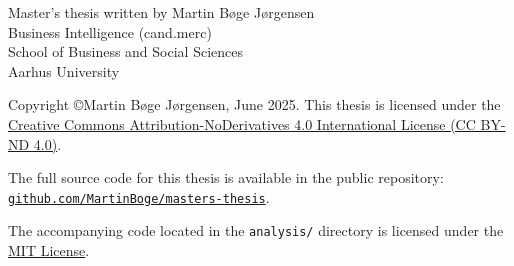 \thispagestyle{plain}

Master's thesis written by Martin Bøge Jørgensen\\
Business Intelligence (cand.merc)\\
School of Business and Social Sciences\\
Aarhus University\\

\vfill

Copyright \copyright \space Martin Bøge Jørgensen, June 2025. This thesis is licensed under the \href{https://creativecommons.org/licenses/by-nd/4.0/}{Creative Commons Attribution-NoDerivatives 4.0 International License (CC BY-ND 4.0)}.

The full source code for this thesis is available in the public repository: \href{https://github.com/MartinBoge/masters-thesis}{\texttt{github.com/MartinBoge/masters-thesis}}.

The accompanying code located in the \texttt{analysis/} directory is licensed under the \href{https://opensource.org/licenses/MIT}{MIT License}.
